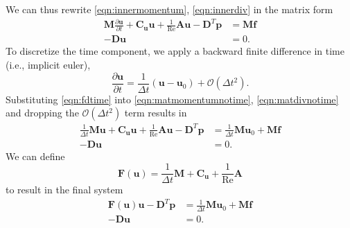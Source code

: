 \documentclass{article}
\newcommand{\mat}[1]{\bm{{#1}}}
\renewcommand{\vec}[1]{\bm{{#1}}}
\newcommand{\bigO}[1]{\mathcal{O}\!\left(#1\right)}
\renewcommand{\Re}{\text{Re}}
\begin{document}
We can thus rewrite \eqref{eqn:innermomentum}, \eqref{eqn:innerdiv} in the matrix form
\begin{align}
  \mat{M}\frac{\partial \vec{u}}{\partial t} + \mat{C}_{\vec{u}}\vec{u} + \frac{1}{\Re} \mat{A}\vec{u} - \mat{D}^T\vec{p} &= \mat{M}\vec{f} \label{eqn:matmomentumnotime} \\
  -\mat{D}\vec{u} &= 0. \label{eqn:matdivnotime}
\end{align}
To discretize the time component, we apply a backward finite difference in time (i.e., implicit euler),
\begin{equation}
  \frac{\partial \vec{u}}{\partial t} = \frac{1}{\Delta t}\left(\vec{u} - \vec{u}_0\right) + \bigO{\Delta t^2}. \label{eqn:fdtime}
\end{equation}
Substituting \eqref{eqn:fdtime} into \eqref{eqn:matmomentumnotime}, \eqref{eqn:matdivnotime} and dropping the $\bigO{\Delta t^2}$ term results in
\begin{align}
  \frac{1}{\Delta t}\mat{M}\vec{u} + \mat{C}_{\vec{u}}\vec{u} + \frac{1}{\Re} \mat{A}\vec{u} - \mat{D}^T\vec{p} &= \frac{1}{\Delta t}\mat{M}\vec{u}_0 + \mat{M}\vec{f} \label{eqn:matmomentum} \\
  -\mat{D}\vec{u} &= 0. \label{eqn:matdiv}
\end{align}
We can define
\begin{equation}
  \mat{F}\left(\vec{u}\right) = \frac{1}{\Delta t}\mat{M} + \mat{C}_{\vec{u}} + \frac{1}{\Re} \mat{A} \label{eqn:F}
\end{equation}
to result in the final system
\begin{align}
  \mat{F}\left(\vec{u}\right) \vec{u} - \mat{D}^T\vec{p} &= \frac{1}{\Delta t}\mat{M}\vec{u}_0 + \mat{M}\vec{f} \label{eqn:fmatmomentum} \\
  -\mat{D}\vec{u} &= 0. \label{eqn:fmatdiv}
\end{align}
\end{document}
